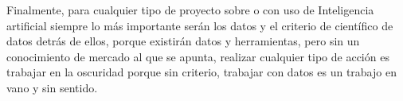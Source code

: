 \par Finalmente, para cualquier tipo de proyecto sobre o con uso de Inteligencia artificial siempre lo más importante serán los datos y el 
criterio de científico de datos detrás de ellos, porque existirán datos y herramientas, pero sin un conocimiento de mercado al que se apunta, 
realizar cualquier tipo de acción es trabajar en la oscuridad porque sin criterio, trabajar con datos es un trabajo en vano y sin sentido.